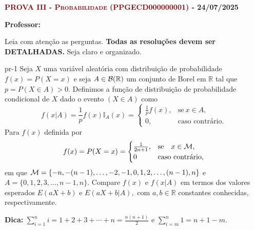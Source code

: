



\oddsidemargin -0.6in %
\evensidemargin 1.0in
\textwidth 7.5in %
\headheight 1.0in 
\topmargin -0.7in %
\textheight 10.8in %

% 

	
	\footnotesize

{\scshape\bf\textcolor{darkred}{PROVA III - Probabilidade (PPGECD000000001)} - 24/07/2025 }



\textsf{\textbf{Professor:}}  

\bigskip 
\begin{regras}
Leia com atenção as perguntas. {\bf Todas as resoluções devem ser DETALHADAS.}  Seja claro e organizado. 
\end{regras}
\vspace{2ex}

	
\begin{problema}{}{pr-1}
Seja $X$ uma variável aleatória com distribuição de probabilidade $f(x)=P(X=x)$ e seja $A\in {\cal B}(\mathbb{R})$ um conjunto de Borel em $\mathbb{R}$ tal que $p=P(X\in A)>0.$ Definimos a função de distribuição de probabilidade condicional de $X$ dado o evento $(X\in A)$ como
$$
f(x|A) = \frac{1}{p}f(x)\mathbb{I}_A(x) = \begin{cases}
	\frac{1}{p}f(x),  & \text{se} \ x\in A, \\
	0, & \text{caso contrário.}
\end{cases}
$$
Para $f(x)$  definida por
	$$
	f(x)=P(X=x) = \begin{cases}
		\frac{1}{2n+1}, & \text{se} \quad x \in {\cal M}, \\
		0 & \text{caso contrário},
	\end{cases}
	$$ em que ${\cal M}=\{-n,-(n-1), \ldots, -2,-1, 0, 1, 2, \ldots, (n-1), n \} $ e $A=\{0,1,2,3, \ldots , n-1, n\}.$ 
Compare $f(x)$ e $f(x|A)$ em termos dos valores esperados $E(aX+b)$ e $E(aX+b|A),$ com $a,b \in \mathbb{R}$ constantes conhecidas, respectivamente. 

{\bf Dica:} 
$\sum^n_{i = 1} i = 1 + 2 + 3 +\cdots + n = \frac{n ( n + 1 )}{2}$ e $
\sum^n_{i = m} 1 = n+1-m.$	

\end{problema}



